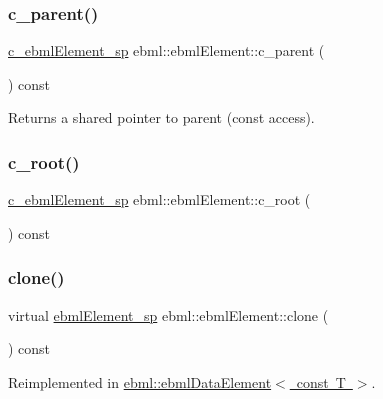 \subsubsection{\texorpdfstring{c\+\_\+parent()}{c\_parent()}}
{\footnotesize\ttfamily \mbox{\hyperlink{namespaceebml_a2deef4e8071531b32e3533f1bf978917}{c\+\_\+ebml\+Element\+\_\+sp}} ebml\+::ebml\+Element\+::c\+\_\+parent (\begin{DoxyParamCaption}{ }\end{DoxyParamCaption}) const}

Returns a shared pointer to parent (const access). \mbox{\label{classebml_1_1ebmlElement_a3dddd3edbb6c96b8765107fccad5826b}} 
\subsubsection{\texorpdfstring{c\+\_\+root()}{c\_root()}}
{\footnotesize\ttfamily \mbox{\hyperlink{namespaceebml_a2deef4e8071531b32e3533f1bf978917}{c\+\_\+ebml\+Element\+\_\+sp}} ebml\+::ebml\+Element\+::c\+\_\+root (\begin{DoxyParamCaption}{ }\end{DoxyParamCaption}) const}

\mbox{\label{classebml_1_1ebmlElement_a94013f01b6f12c9c66864d44983dce47}} 
\subsubsection{\texorpdfstring{clone()}{clone()}}
{\footnotesize\ttfamily virtual \mbox{\hyperlink{namespaceebml_adad533b7705a16bb360fe56380c5e7be}{ebml\+Element\+\_\+sp}} ebml\+::ebml\+Element\+::clone (\begin{DoxyParamCaption}{ }\end{DoxyParamCaption}) const\hspace{0.3cm}{\ttfamily [virtual]}}



Reimplemented in \mbox{\hyperlink{classebml_1_1ebmlDataElement_3_01const_01T_01_4_a23f7032682dfdf20ce042caf144e50d6}{ebml\+::ebml\+Data\+Element$<$ const T $>$}}.

